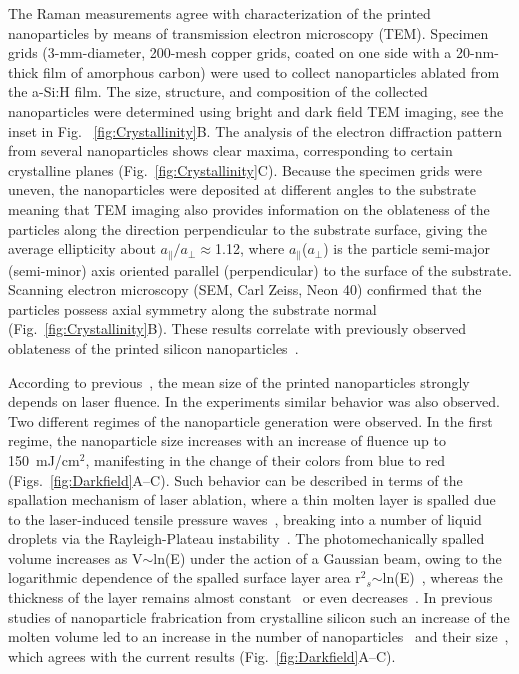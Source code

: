                 The Raman measurements agree with characterization of the printed nanoparticles by means of transmission electron
            microscopy (TEM). Specimen grids (3-mm-diameter, 200-mesh copper grids, coated on one side with a 20-nm-thick
            film of amorphous carbon) were used to collect nanoparticles ablated from the a-Si:H film. The size, structure, and composition
            of the collected nanoparticles were determined using bright and dark field TEM imaging, see the inset in Fig.
            ~\ref{fig:Crystallinity}B. The analysis of the electron diffraction pattern from several nanoparticles shows clear maxima,
            corresponding to certain crystalline planes (Fig.~\ref{fig:Crystallinity}C). Because the specimen grids were uneven, the
            nanoparticles were deposited at different angles to the substrate meaning that TEM imaging also provides information
            on the oblateness of the particles along the direction perpendicular to the substrate surface, giving the average
            ellipticity about $a_{\parallel}/a_{\perp}\approx$1.12, where $a_{\parallel}$($a_{\perp}$) is the particle semi-major
            (semi-minor) axis oriented parallel (perpendicular) to the surface of the substrate. Scanning electron
            microscopy (SEM, Carl Zeiss, Neon 40) confirmed that the particles possess axial symmetry along the substrate
            normal (Fig.~\ref{fig:Crystallinity}B). These results correlate with previously observed oblateness of the printed silicon
            nanoparticles~\cite{zywietz2014laser}.

                According to previous~\cite{zywietz2014laser, zywietz2014generation}, the mean size of the printed nanoparticles
            strongly depends on laser fluence. In the experiments similar behavior was also observed. Two different
            regimes of the nanoparticle generation were observed. In the first regime, the nanoparticle size increases
            with an increase of fluence up to 150~mJ/cm$^{2}$, manifesting in the change of their colors from blue to red
            (Figs.~\ref{fig:Darkfield}A--C). Such behavior can be described in terms of the spallation mechanism of laser ablation, where
            a thin molten layer is spalled due to the laser-induced tensile pressure waves~\cite{ionin2013thermal,wu2014microscopic},
            breaking into a number of liquid droplets via the Rayleigh-Plateau instability~\cite{papageorgiou1995breakup}.
            The photomechanically spalled volume increases as V$\sim$ln(E) under the action of a Gaussian beam, owing to the
            logarithmic dependence of the spalled surface layer area r$^{2}$$_{s}$$\sim$ln(E)~\cite{bauerle2013laser}, whereas
            the thickness of the layer remains almost constant~\cite{ionin2013thermal} or even decreases~\cite{wu2014microscopic}.
            In previous studies of nanoparticle frabrication from crystalline silicon such an increase of the molten volume led
            to an increase in the number of nanoparticles~\cite{zywietz2014generation} and their size~\cite{zywietz2014laser},
            which agrees with the current results (Fig.~\ref{fig:Darkfield}A--C).

